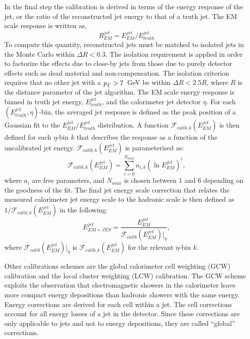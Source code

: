 In the final step the calibration is derived in terms of the energy response of the jet, or the ratio of the reconstructed jet energy to that of a truth jet.  The EM scale response is written as,
%
\begin{equation}
R^{jet}_{EM} = E^{jet}_{EM} / E^{jet}_{truth}
\end{equation}
%
To compute this quantity, reconstructed jets must be matched to isolated jets in the Monte Carlo within $\Delta R < 0.3$. The isolation requirement is applied in order to factorize the effects due to close-by jets from those due to purely detector effects such as dead material and non-compensation. The isolation criterion requires that no other jet with a ${\emph{p}_{T}} > 7$~GeV be within $\Delta R < 2.5R$, where $R$ is the distance parameter of the jet algorithm. The EM scale energy response is binned in truth jet energy, $E^{jet}_{truth}$, and the calorimeter jet detector $\eta$.  For each $(E^{jet}_{truth}, \eta)$-bin, the averaged jet response is defined as the peak position of a Gaussian fit to the $E^{jet}_{EM} / E^{jet}_{truth}$ distribution.  A function $\mathcal{F}_{calib,k}(E^{jet}_{EM})$ is then defined for each $\eta$-bin $k$ that describes the response as a function of the uncalibrated jet energy. $\mathcal{F}_{calib,k}(E^{jet}_{EM})$ is parameterised as:
%
\begin{equation}
\mathcal{F}_{calib,k}(E^{jet}_{EM}) = \sum_{i=0}^{N_{max}} a_{i,k} (\ln E^{jet}_{EM})^i,
\end{equation}
%
where $a_i$ are free parameters, and $N_{max}$ is chosen between 1 and 6 depending on the goodness of the fit. The final jet energy scale correction that relates the measured calorimeter jet energy scale to the hadronic scale is then defined as $1/\mathcal{F}_{calib,k}(E^{jet}_{EM})$ in the following:
%
\begin{equation}
E^{jet}_{EM+JES} = \frac{E^{jet}_{EM}}{\mathcal{F}_{calib}(E^{jet}_{EM})|_{\eta}},
\end{equation}
%
where $\mathcal{F}_{calib}(E^{jet}_{EM})|_{\eta}$  is $\mathcal{F}_{calib,k}(E^{jet}_{EM})$ for the relevant $\eta$-bin $k$.


Other calibrations schemes are the global calorimeter cell weighting (GCW) calibration and the local cluster weighting (LCW) calibration.  The GCW scheme exploits the observation that electromagnetic showers in the calorimeter leave more compact energy depositions than hadronic showers with the same energy.  Energy corrections are derived for each cell within a jet.  The cell corrections account for all energy losses of a jet in the detector. Since these corrections are only applicable to jets and not to energy depositions, they are called ``global'' corrections.

